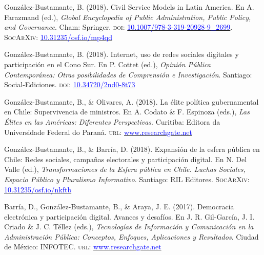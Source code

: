 \begin{publications}

\begin{benumerate}{12}
\item{\small Gonz\'alez-Bustamante, B. (2018). Civil Service Models in Latin America. En A. Farazmand (ed.), {\itshape Global Encyclopedia of Public Administration, Public Policy, and Governance}. Cham: Springer. {\scshape doi}: \href{https://doi.org/10.1007/978-3-319-20928-9\_2699}{\textcolor{blue}{10.1007/978-3-319-20928-9\_2699}}. {\scshape \footnotesize SocArXiv}: \href{https://doi.org/10.31235/osf.io/mp4qd}{\textcolor{blue}{10.31235/osf.io/mp4qd}}}\vspace{1mm}

\item{\small Gonz\'alez-Bustamante, B. (2018). Internet, uso de redes sociales digitales y participación en el Cono Sur. En P. Cottet (ed.), {\itshape Opini\'on P\'ublica Contempor\'anea: Otras posibilidades de Comprensi\'on e Investigaci\'on}. Santiago: Social-Ediciones. {\scshape doi}: \href{https://doi.org/10.34720/2nd0-8t73}{\textcolor{blue}{10.34720/2nd0-8t73}}}\vspace{1mm}

\item{\small Gonz\'alez-Bustamante, B., \& Olivares, A. (2018). La élite política gubernamental en Chile: Supervivencia de ministros. En A. Codato \& F. Espinoza (eds.), {\itshape Las \'Elites en las Am\'ericas: Diferentes Perspectivas}. Curitiba: Editora da Universidade Federal do Paraná. {\scshape url}: \href{https://www.researchgate.net/publication/325699783_Elites_en_las_Americas_diferentes_perspectivas_Elites_in_the_Americas_Different_Perspectives}{\textcolor{blue}{www.researchgate.net}}} \vspace{1mm}

\item{\small Gonz\'alez-Bustamante, B., \& Barr\'ia, D. (2018). Expansión de la esfera pública en Chile: Redes sociales, campañas electorales y participación digital. En N. Del Valle (ed.), {\itshape Transformaciones de la Esfera p\'ublica en Chile. Luchas Sociales, Espacio P\'ublico y Pluralismo Informativo}. Santiago: RIL Editores. {\scshape \footnotesize SocArXiv}: \href{https://doi.org/10.31235/osf.io/nkftb}{\textcolor{blue}{10.31235/osf.io/nkftb}}}\vspace{1mm}

\item{\small Barr\'ia, D., Gonz\'alez-Bustamante, B., \& Araya, J. E. (2017). Democracia electrónica y participación digital. Avances y desafíos. En J. R. Gil-Garc\'ia, J. I. Criado \&  J. C. T\'ellez (eds.), {\itshape Tecnolog\'ias de Informaci\'on y Comunicaci\'on en la Administraci\'on P\'ublica: Conceptos, Enfoques, Aplicaciones y Resultados}. Ciudad de México: INFOTEC. {\scshape url}: \href{https://www.researchgate.net/publication/321980289_Democracia_electronica_y_participacion_digital_Avances_y_desafios}{\textcolor{blue}{www.researchgate.net}}} \vspace{1mm}


\end{benumerate}
\end{publications}
